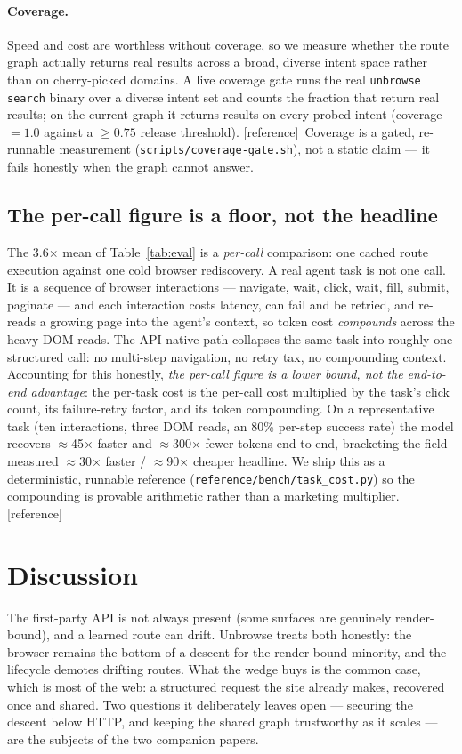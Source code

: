 \documentclass[11pt]{article}
\newcommand{\refimpl}{\textcolor{blue!70!black}{\small[reference]}}
\begin{document}
\paragraph{Coverage.} Speed and cost are worthless without coverage, so we measure
whether the route graph actually returns real results across a broad, diverse intent
space rather than on cherry-picked domains. A live coverage gate runs the real
\texttt{unbrowse search} binary over a diverse intent set and counts the fraction
that return real results; on the current graph it returns results on every probed
intent (coverage $=1.0$ against a $\geq 0.75$ release threshold). \refimpl\ Coverage
is a gated, re-runnable measurement (\texttt{scripts/coverage-gate.sh}), not a static
claim --- it fails honestly when the graph cannot answer.

\subsection{The per-call figure is a floor, not the headline}
The 3.6$\times$ mean of Table~\ref{tab:eval} is a \emph{per-call} comparison: one
cached route execution against one cold browser rediscovery. A real agent task is
not one call. It is a sequence of browser interactions --- navigate, wait, click,
wait, fill, submit, paginate --- and each interaction costs latency, can fail and be
retried, and re-reads a growing page into the agent's context, so token cost
\emph{compounds} across the heavy DOM reads. The API-native path collapses the same
task into roughly one structured call: no multi-step navigation, no retry tax, no
compounding context. Accounting for this honestly, \emph{the per-call figure is a
lower bound, not the end-to-end advantage}: the per-task cost is the per-call cost
multiplied by the task's click count, its failure-retry factor, and its token
compounding. On a representative task (ten interactions, three DOM reads, an 80\%
per-step success rate) the model recovers $\approx$45$\times$ faster and
$\approx$300$\times$ fewer tokens end-to-end, bracketing the field-measured
$\approx$30$\times$ faster / $\approx$90$\times$ cheaper headline. We ship this as a
deterministic, runnable reference (\texttt{reference/bench/task\_cost.py}) so the
compounding is provable arithmetic rather than a marketing multiplier. \refimpl

\section{Discussion}
The first-party API is not always present (some surfaces are genuinely
render-bound), and a learned route can drift. Unbrowse treats both honestly: the
browser remains the bottom of a descent for the render-bound minority, and the
lifecycle demotes drifting routes. What the wedge buys is the common case, which is
most of the web: a structured request the site already makes, recovered once and
shared. Two questions it deliberately leaves open --- securing the descent below
HTTP, and keeping the shared graph trustworthy as it scales --- are the subjects of
the two companion papers.
\end{document}

